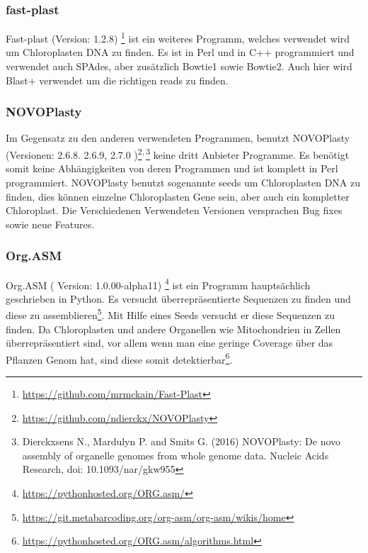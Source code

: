 \documentclass{scrartcl}
\begin{document}
\subsubsection{fast-plast}
\label{sec-1-5-2}
Fast-plast  (Version: 1.2.8) \footnote{\url{https://github.com/mrmckain/Fast-Plast}} ist ein weiteres Programm, welches verwendet wird um Chloroplasten DNA zu finden. Es ist in Perl und in C++ programmiert und verwendet auch SPAdes, 
aber zusätzlich Bowtie1 sowie Bowtie2. Auch hier wird Blast+ verwendet um die richtigen reads zu finden. 
\subsubsection{NOVOPlasty}
\label{sec-1-5-3}
Im Gegensatz zu den anderen verwendeten Programmen, benutzt NOVOPlasty (Versionen: 2.6.8. 2.6.9, 2.7.0 )\footnote{\url{https://github.com/ndierckx/NOVOPlasty}}\textsuperscript{,}\,\footnote{Dierckxsens N., Mardulyn P. and Smits G. (2016) NOVOPlasty: De novo assembly of organelle genomes from whole genome data. Nucleic Acids Research, doi: 10.1093/nar/gkw955} keine dritt Anbieter Programme. Es benötigt somit keine Abhängigkeiten von deren Programmen
und ist komplett in Perl programmiert. NOVOPlasty benutzt sogenannte seeds um Chloroplasten DNA zu finden, dies können einzelne Chloroplasten Gene sein, aber auch ein kompletter Chloroplast.
Die Verschiedenen Verwendeten Versionen versprachen Bug fixes sowie neue Features. 
\subsubsection{Org.ASM}
\label{sec-1-5-4}
Org.ASM ( Version: 1.0.00-alpha11) \footnote{\url{https://pythonhosted.org/ORG.asm/}} ist ein Programm hauptsächlich geschrieben in Python. Es versucht überrepräsentierte Sequenzen zu finden und diese zu assemblieren\footnote{\url{https://git.metabarcoding.org/org-asm/org-asm/wikis/home}}. 
Mit Hilfe eines Seeds versucht er diese Sequenzen zu finden. Da Chloroplasten und andere Organellen wie Mitochondrien in Zellen überrepräsentiert sind, vor allem
wenn man eine geringe Coverage über das Pflanzen Genom hat, sind diese somit detektierbar\footnote{\url{https://pythonhosted.org/ORG.asm/algorithms.html}}.
\end{document}
